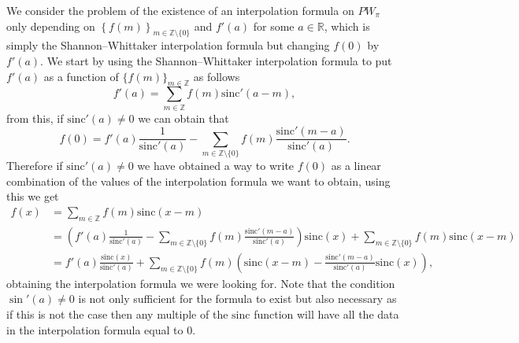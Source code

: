 \documentclass[reqno]{amsart}
\theoremstyle{plain}
\theoremstyle{definition}
\numberwithin{equation}{section}
\newcommand{\Z}{{\mathbb Z}}
\newcommand{\R}{{\mathbb R}}
\newcommand{\pa}[1]{\left(#1\right)}
\newcommand{\suc}[1]{\left\{#1\right\}}
\newcommand{\sinc}{\mathrm{sinc}}
\begin{document}
We consider the problem of the existence of an interpolation formula on $PW_\pi$ only depending on $\suc{f(m)}_{m\in\Z\setminus\{0\}}$ and $f'(a)$ for some $a\in\R$, which is simply the Shannon--Whittaker interpolation formula but changing $f(0)$ by $f'(a)$. We start by using the Shannon--Whittaker interpolation formula to put $f'(a)$ as a function of $\{f(m)\}_{m\in\Z}$ as follows
$$f'(a)=\sum_{m\in\Z} f(m) \sinc'(a-m),$$
from this, if $\sinc'(a)\neq 0$ we can obtain that
$$f(0)=f'(a)\frac{1}{\sinc'(a)}-\sum_{m\in\Z\setminus\{0\}} f(m) \frac{\sinc'(m-a)}{\sinc'(a)}.$$
Therefore if $\sinc'(a)\neq 0$ we have obtained a way to write $f(0)$ as a linear combination  of the values of the interpolation formula we want to obtain, using this we get
\begin{align*}
    f(x) &= \sum_{m\in\Z} f(m) \sinc(x-m) \\
    &= \pa{f'(a)\frac{1}{\sinc'(a)}-\sum_{m\in\Z\setminus\{0\}} f(m)\frac{\sinc'(m-a)}{\sinc'(a)}} 
    \sinc(x) + \sum_{m\in\Z\setminus\{0\}} f(m) \sinc(x-m) \\
    &= f'(a)\frac{\sinc(x)}{\sinc'(a)} + 
    \sum_{m\in\Z\setminus\{0\}} f(m) \pa{\sinc(x-m)-\frac{\sinc'(m-a)}{\sinc'(a)}\sinc(x)},
\end{align*}
obtaining the interpolation formula we were looking for. Note that the condition $\sin'(a)\neq 0$ is not only sufficient for the formula to exist but also necessary as if this is not the case then any multiple of the $\sinc$ function will have all the data in the interpolation formula equal to 0. 
\end{document}
